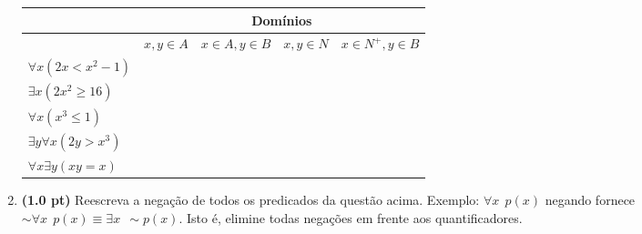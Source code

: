 \documentclass[a4paper,12pt]{article}
\begin{document}
\begin{enumerate}
\begin{center}
\begin{tabular}{l|l|l|l|l} \hline \hline
 & \multicolumn{4}{c}{Domínios} \\ \hline
 & $x,y \in A$ & $x \in A, y \in B$ & $x,y \in N$ & $x \in N^{+}, y \in B$ \\ \hline

$\forall x (2x < x^2-1)$ & & & & \\ \hline
$\exists x (2x^2 \geq 16)$ & & & & \\ \hline
$\forall x (x^3 \leq 1)$ & & & & \\ \hline
$\exists y \forall x (2y > x^3)$ & & & & \\ \hline
$\forall x \exists y (xy = x)$ & & & & \\ \hline \hline
\end{tabular}
\end{center}


\item  {\bf (1.0 pt)} Reescreva a negação de todos os predicados 
da questão acima. Exemplo: $\forall x \:\: p(x)$ negando
fornece $\sim \forall x \:\: p(x) \equiv  \exists x \:\: \sim p(x)$.
Isto é, elimine todas  negações em frente aos quantificadores.





\end{enumerate}
\end{document}

